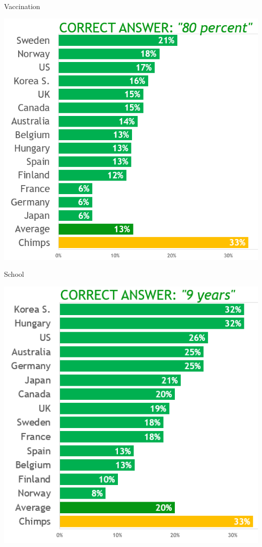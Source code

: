 \documentclass{beamer}
\begin{document}
\begin{frame}{Vaccination}
\begin{center}
\includegraphics[scale=0.35]{img/vax_q.png}
\end{center}
\end{frame}

\begin{frame}{School}
\begin{center}
\includegraphics[scale=0.4]{img/school_q.png}
\end{center}
\end{frame}
\end{document}
